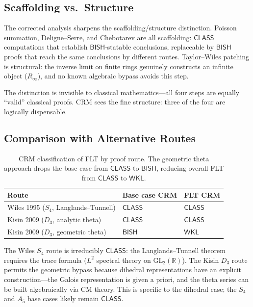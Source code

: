 \documentclass[11pt,a4paper]{article}
\theoremstyle{plain}
\theoremstyle{definition}
\newcommand{\BISH}{\textsf{BISH}}
\newcommand{\WKL}{\textsf{WKL}}
\newcommand{\CLASS}{\textsf{CLASS}}
\newcommand{\R}{\mathbb{R}}
\newcommand{\GL}{\mathrm{GL}}
\begin{document}
\subsection{Scaffolding vs.\ Structure}

The corrected analysis sharpens the scaffolding/structure distinction.
Poisson summation, Deligne--Serre, and Chebotarev are all scaffolding: $\CLASS$ computations that establish $\BISH$-statable conclusions, replaceable by $\BISH$ proofs that reach the same conclusions by different routes.
Taylor--Wiles patching is structural: the inverse limit on finite rings genuinely constructs an infinite object ($R_\infty$), and no known algebraic bypass avoids this step.

The distinction is invisible to classical mathematics---all four steps are equally ``valid'' classical proofs.
CRM sees the fine structure: three of the four are logically dispensable.

\subsection{Comparison with Alternative Routes}

\begin{table}[h]
\centering
\begin{tabular}{@{}lll@{}}
\toprule
\textbf{Route} & \textbf{Base case CRM} & \textbf{FLT CRM} \\
\midrule
Wiles 1995 ($S_4$, Langlands--Tunnell) & $\CLASS$ & $\CLASS$ \\
Kisin 2009 ($D_3$, analytic theta) & $\CLASS$ & $\CLASS$ \\
Kisin 2009 ($D_3$, geometric theta) & $\BISH$ & $\WKL$ \\
\bottomrule
\end{tabular}
\caption{CRM classification of FLT by proof route. The geometric theta approach drops the base case from $\CLASS$ to $\BISH$, reducing overall FLT from $\CLASS$ to $\WKL$.}
\label{tab:routes}
\end{table}

The Wiles $S_4$ route is irreducibly $\CLASS$: the Langlands--Tunnell theorem requires the trace formula ($L^2$ spectral theory on $\GL_2(\R)$).
The Kisin $D_3$ route permits the geometric bypass because dihedral representations have an explicit construction---the Galois representation is given a priori, and the theta series can be built algebraically via CM theory.
This is specific to the dihedral case; the $S_4$ and $A_5$ base cases likely remain $\CLASS$.
\end{document}
